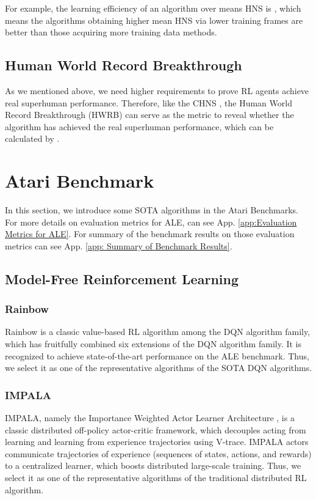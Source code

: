\documentclass[nohyperref]{article}
\theoremstyle{plain}
\begin{document}
For example, the learning efficiency of an algorithm over means HNS is , which means the algorithms obtaining higher mean HNS via lower training frames are better than those acquiring more training data methods.
\subsection{Human World Record Breakthrough}
As we mentioned above, we need higher requirements to prove RL agents achieve real superhuman performance. Therefore, like the CHNS \citep{agent57}, the Human World Record Breakthrough (HWRB) can serve as the metric to reveal whether the algorithm has achieved the real superhuman performance, which can be calculated by .


\clearpage
\section{Atari Benchmark}
\label{app: atari benchmark}

In this section, we introduce some SOTA algorithms in the Atari Benchmarks. For more details on evaluation metrics for ALE, can see App. \ref{app:Evaluation Metrics for ALE}. For summary of the benchmark results on those evaluation metrics can see App. \ref{app: Summary of Benchmark Results}. 


\subsection{Model-Free Reinforcement Learning}
\subsubsection{Rainbow}
Rainbow \citep{rainbow} is a classic value-based RL algorithm among the  DQN algorithm family, which has fruitfully combined six extensions of the DQN algorithm family. It is recognized to achieve state-of-the-art performance on the ALE benchmark. Thus, we select it as one of the representative algorithms of the SOTA DQN algorithms.
\subsubsection{IMPALA}
IMPALA, namely the Importance Weighted Actor Learner Architecture \citep{impala}, is a classic distributed off-policy actor-critic framework, which decouples acting from learning and learning from experience trajectories using V-trace. IMPALA actors communicate trajectories of experience (sequences of states, actions, and rewards) to a centralized learner, which boosts distributed large-scale training. Thus, we select it as one of the representative algorithms of the traditional distributed RL algorithm.
\end{document}
